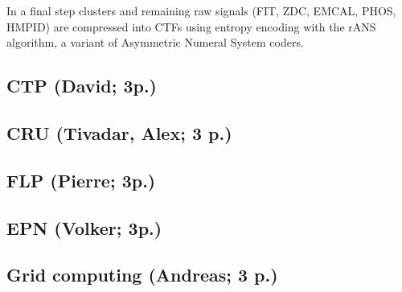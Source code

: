 In a final step clusters and remaining raw signals (FIT, ZDC, EMCAL, PHOS, HMPID) are compressed into CTFs using entropy encoding with the rANS algorithm, a variant of 
Asymmetric Numeral System coders.


\subsection{CTP (David; 3p.)}
\subsection{CRU (Tivadar, Alex; 3 p.)}
\subsection{FLP (Pierre; 3p.)}

\subsection{EPN (Volker; 3p.)}
\subsection{Grid computing (Andreas; 3 p.)}
